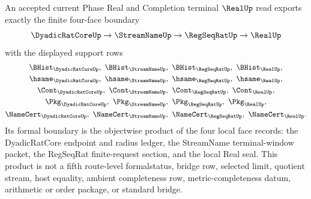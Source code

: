 \begin{theorem}
\label{thm:real-l10-formal-boundary-exit-certificate}
An accepted current Phase Real and Completion terminal $\RealUp$ read exports
exactly the finite four-face boundary
$$
\DyadicRatCoreUp \to \StreamNameUp \to \RegSeqRatUp \to \RealUp
$$
with the displayed support rows
$$
\begin{gathered}
\BHist_{\DyadicRatCoreUp},\ \BHist_{\StreamNameUp},\
\BHist_{\RegSeqRatUp},\ \BHist_{\RealUp},\\
\hsame_{\DyadicRatCoreUp},\ \hsame_{\StreamNameUp},\
\hsame_{\RegSeqRatUp},\ \hsame_{\RealUp},\\
\Cont_{\DyadicRatCoreUp},\ \Cont_{\StreamNameUp},\
\Cont_{\RegSeqRatUp},\ \Cont_{\RealUp},\\
\Pkg_{\DyadicRatCoreUp},\ \Pkg_{\StreamNameUp},\
\Pkg_{\RegSeqRatUp},\ \Pkg_{\RealUp},\\
\NameCert_{\DyadicRatCoreUp},\ \NameCert_{\StreamNameUp},\
\NameCert_{\RegSeqRatUp},\ \NameCert_{\RealUp}.
\end{gathered}
$$
Its formal boundary is the objectwise product of the four local face records:
the DyadicRatCore endpoint and radius ledger, the StreamName terminal-window
packet, the RegSeqRat finite-request section, and the local Real seal. This
product is not a fifth route-level formalstatus, bridge row, selected limit,
quotient stream, host equality, ambient completeness row, metric-completeness
datum, arithmetic or order package, or standard bridge.
\end{theorem}
